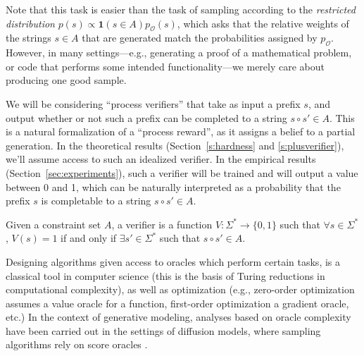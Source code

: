 Note that this task is easier than the task of sampling according to the \emph{restricted distribution} $p(s) \propto \mathbf{1}(s \in A) p_{\mathcal{O}}(s)$, which asks that the relative weights of the strings $s \in A$ that are generated match the probabilities assigned by $p_{\mathcal{O}}$. However, in many settings---e.g., generating a proof of a mathematical problem, or code that performs some intended functionality---we merely care about producing one good sample.    

We will be considering ``process verifiers'' that take as input a prefix $s$, and output whether or not such a prefix can be completed to a string $s \circ s' \in A$. This is a natural formalization of a ``process reward'', as it assigns a belief to a partial generation. In the theoretical results (Section~\ref{s:hardness} and \ref{s:plusverifier}), we'll assume access to such an idealized verifier. In the empirical results (Section~\ref{sec:experiments}), such a verifier will be trained and will output a value between 0 and 1, which can be naturally interpreted as a probability that the prefix $s$ is completable to a string $s \circ s' \in A$.  
\begin{definition}
\label{def:verifier}
    Given a constraint set $A$,
    a verifier is a function $V: \Sigma^{*} \to \{0,1\}$ such that 
    $\forall s \in \Sigma^*$,
    $V(s) = 1$ if and only if 
    $\exists s' \in \Sigma^*$ 
    such that $s \circ s' \in A$.
\end{definition}
Designing algorithms given access to oracles which perform certain tasks, is a classical tool in computer science (this is the basis of Turing reductions in computational complexity), as well as optimization (e.g., zero-order optimization assumes a value oracle for a function, first-order optimization a gradient oracle, etc.) In the context of generative modeling, analyses based on oracle complexity have been carried out in the settings of diffusion models, where sampling algorithms rely on score oracles \cite{chen2022sampling}.


